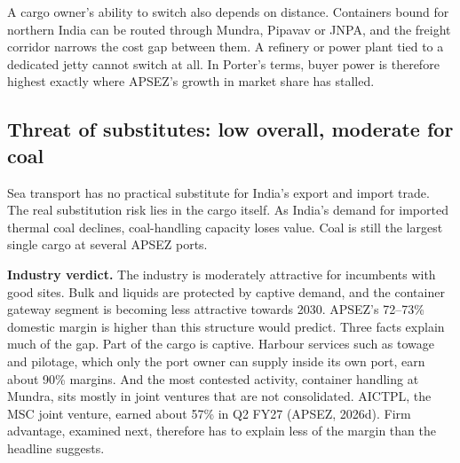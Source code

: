 \documentclass[12pt, a4paper]{article}
\begin{document}
A cargo owner's ability to switch also depends on distance. Containers bound
for northern India can be routed through Mundra, Pipavav or JNPA, and the
freight corridor narrows the cost gap between them. A refinery or power plant
tied to a dedicated jetty cannot switch at all. In Porter's terms, buyer power
is therefore highest exactly where APSEZ's growth in market share has stalled.

\subsection{Threat of substitutes: low overall, moderate for coal}
Sea transport has no practical substitute for India's export and import trade.
The real substitution risk lies in the cargo itself. As India's demand for
imported thermal coal declines, coal-handling capacity loses value. Coal is
still the largest single cargo at several APSEZ ports.

\textbf{Industry verdict.} The industry is moderately attractive for incumbents
with good sites. Bulk and liquids are protected by captive demand, and the
container gateway segment is becoming less attractive towards 2030. APSEZ's
72--73\% domestic margin is higher than this structure would predict. Three
facts explain much of the gap. Part of the cargo is captive. Harbour services
such as towage and pilotage, which only the port owner can supply inside its
own port, earn about 90\% margins. And the most contested activity, container
handling at Mundra, sits mostly in joint ventures that are not consolidated.
AICTPL, the MSC joint venture, earned about 57\% in Q2 FY27 (APSEZ, 2026d). Firm
advantage, examined next, therefore has to explain less of the margin than the
headline suggests.
\end{document}

